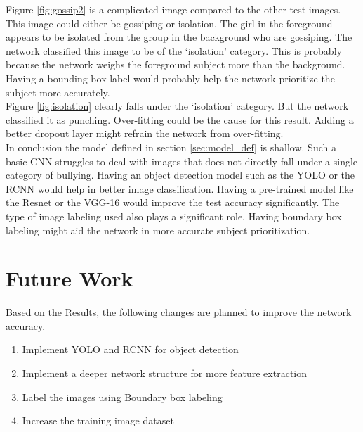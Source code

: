 \documentclass[12pt]{article}
\begin{document}
Figure \ref{fig:gossip2} is a complicated image compared to the other test images. This image could either be gossiping or isolation. The girl in the foreground appears to be isolated from the group in the background who are gossiping. The network classified this image to be of the \lq{isolation}\rq{} category. This is probably because the network weighs the foreground subject more than the background. Having a bounding box label would probably help the network prioritize the subject more accurately. \\

Figure \ref{fig:isolation} clearly falls under the \lq{isolation}\rq{} category. But the network classified it as punching. Over-fitting could be the cause for this result. Adding a better dropout layer might refrain the network from over-fitting. \\

In conclusion the model defined in section \ref{sec:model_def} is shallow. Such a basic CNN struggles to deal with images that does not directly fall under a single category of bullying. Having an object detection model such as the YOLO or the RCNN would help in better image classification. Having a pre-trained model like the Resnet or the VGG-16 would improve the test accuracy significantly. The type of image labeling used also plays a significant role. Having boundary box labeling might aid the network in more accurate subject prioritization.   


\section{Future Work}
Based on the Results, the following changes are planned to improve the network accuracy. 
\begin{enumerate}
	\item Implement YOLO and RCNN for object detection
	\item Implement a deeper network structure for more feature extraction
	\item Label the images using Boundary box labeling
	\item Increase the training image dataset
\end{enumerate}


 
 
\newpage
\end{document}
